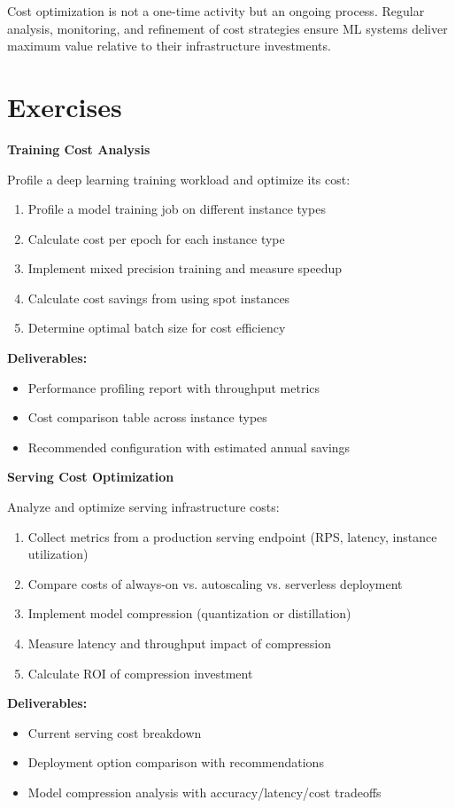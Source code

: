 Cost optimization is not a one-time activity but an ongoing process. Regular analysis, monitoring, and refinement of cost strategies ensure ML systems deliver maximum value relative to their infrastructure investments.

\section{Exercises}

\begin{exercise}
\textbf{Training Cost Analysis}

Profile a deep learning training workload and optimize its cost:

\begin{enumerate}
    \item Profile a model training job on different instance types
    \item Calculate cost per epoch for each instance type
    \item Implement mixed precision training and measure speedup
    \item Calculate cost savings from using spot instances
    \item Determine optimal batch size for cost efficiency
\end{enumerate}

\textbf{Deliverables:}
\begin{itemize}
    \item Performance profiling report with throughput metrics
    \item Cost comparison table across instance types
    \item Recommended configuration with estimated annual savings
\end{itemize}
\end{exercise}

\begin{exercise}
\textbf{Serving Cost Optimization}

Analyze and optimize serving infrastructure costs:

\begin{enumerate}
    \item Collect metrics from a production serving endpoint (RPS, latency, instance utilization)
    \item Compare costs of always-on vs. autoscaling vs. serverless deployment
    \item Implement model compression (quantization or distillation)
    \item Measure latency and throughput impact of compression
    \item Calculate ROI of compression investment
\end{enumerate}

\textbf{Deliverables:}
\begin{itemize}
    \item Current serving cost breakdown
    \item Deployment option comparison with recommendations
    \item Model compression analysis with accuracy/latency/cost tradeoffs
\end{itemize}
\end{exercise}

